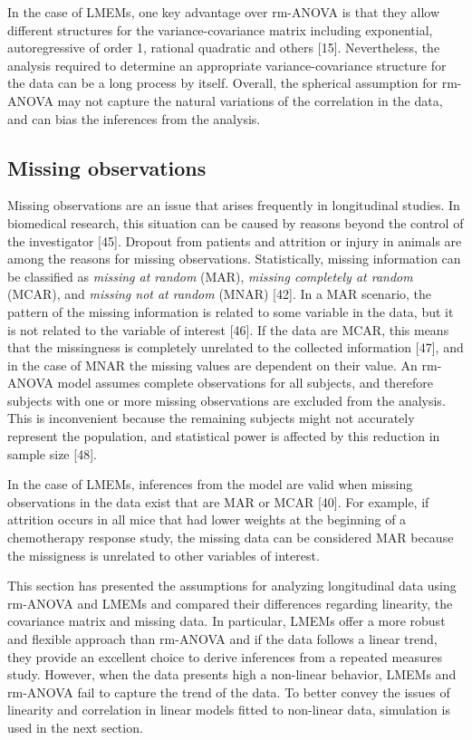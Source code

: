 \documentclass[
]{article}
\begin{document}
In the case of LMEMs, one key advantage over rm-ANOVA is that they allow different structures for the variance-covariance matrix including exponential, autoregressive of order 1, rational quadratic and others {[}15{]}. Nevertheless, the analysis required to determine an appropriate variance-covariance structure for the data can be a long process by itself. Overall, the spherical assumption for rm-ANOVA may not capture the natural variations of the correlation in the data, and can bias the inferences from the analysis.

\hypertarget{missing-observations}{%
\subsection{Missing observations}\label{missing-observations}}

Missing observations are an issue that arises frequently in longitudinal studies. In biomedical research, this situation can be caused by reasons beyond the control of the investigator {[}45{]}. Dropout from patients and attrition or injury in animals are among the reasons for missing observations. Statistically, missing information can be classified as \emph{missing at random} (MAR), \emph{missing completely at random} (MCAR), and \emph{missing not at random} (MNAR) {[}42{]}. In a MAR scenario, the pattern of the missing information is related to some variable in the data, but it is not related to the variable of interest {[}46{]}. If the data are MCAR, this means that the missingness is completely unrelated to the collected information {[}47{]}, and in the case of MNAR the missing values are dependent on their value. An rm-ANOVA model assumes complete observations for all subjects, and therefore subjects with one or more missing observations are excluded from the analysis. This is inconvenient because the remaining subjects might not accurately represent the population, and statistical power is affected by this reduction in sample size {[}48{]}.

In the case of LMEMs, inferences from the model are valid when missing observations in the data exist that are MAR or MCAR {[}40{]}. For example, if attrition occurs in all mice that had lower weights at the beginning of a chemotherapy response study, the missing data can be considered MAR because the missigness is unrelated to other variables of interest.

This section has presented the assumptions for analyzing longitudinal data using rm-ANOVA and LMEMs and compared their differences regarding linearity, the covariance matrix and missing data. In particular, LMEMs offer a more robust and flexible approach than rm-ANOVA and if the data follows a linear trend, they provide an excellent choice to derive inferences from a repeated measures study. However, when the data presents high a non-linear behavior, LMEMs and rm-ANOVA fail to capture the trend of the data. To better convey the issues of linearity and correlation in linear models fitted to non-linear data, simulation is used in the next section.
\end{document}
